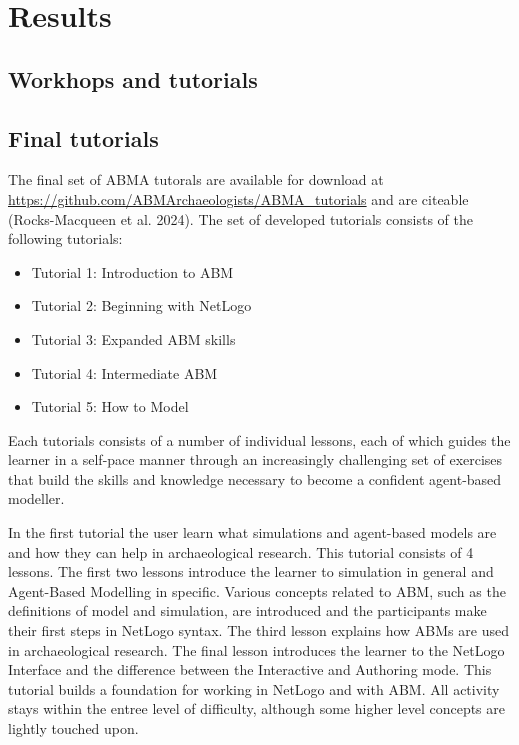 \documentclass[
]{article}
\begin{document}
\hypertarget{results}{%
\section{Results}\label{results}}

\hypertarget{workhops-and-tutorials}{%
\subsection{Workhops and tutorials}\label{workhops-and-tutorials}}

\hypertarget{final-tutorials}{%
\subsection{Final tutorials}\label{final-tutorials}}

The final set of ABMA tutorals are available for download at \url{https://github.com/ABMArchaeologists/ABMA_tutorials} and are citeable (Rocks-Macqueen et al. 2024). The set of developed tutorials consists of the following tutorials:

\begin{itemize}
\item
  Tutorial 1: Introduction to ABM
\item
  Tutorial 2: Beginning with NetLogo
\item
  Tutorial 3: Expanded ABM skills
\item
  Tutorial 4: Intermediate ABM
\item
  Tutorial 5: How to Model
\end{itemize}

Each tutorials consists of a number of individual lessons, each of which guides the learner in a self-pace manner through an increasingly challenging set of exercises that build the skills and knowledge necessary to become a confident agent-based modeller.

In the first tutorial the user learn what simulations and agent-based models are and how they can help in archaeological research. This tutorial consists of 4 lessons. The first two lessons introduce the learner to simulation in general and Agent-Based Modelling in specific. Various concepts related to ABM, such as the definitions of model and simulation, are introduced and the participants make their first steps in NetLogo syntax. The third lesson explains how ABMs are used in archaeological research. The final lesson introduces the learner to the NetLogo Interface and the difference between the Interactive and Authoring mode. This tutorial builds a foundation for working in NetLogo and with ABM. All activity stays within the entree level of difficulty, although some higher level concepts are lightly touched upon.
\end{document}
